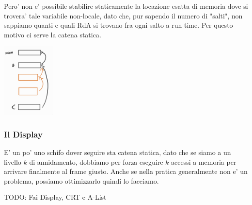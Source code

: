 Pero' non e' possibile stabilire staticamente la locazione esatta di memoria dove si trovera' tale variabile non-locale, dato che, pur sapendo il numero di "salti", non sappiamo quanti e quali RdA si trovano fra ogni salto a run-time. Per questo motivo ci serve la catena statica.

\begin{center}
  \includegraphics[width=0.2\textwidth]{img/2025-03-06-13-14-42.png}
\end{center}

\subsubsection{Il Display}

E' un po' uno schifo dover seguire sta catena statica, dato che se siamo a un livello $ k $ di annidamento, dobbiamo per forza eseguire $ k $ accessi a memoria per arrivare finalmente al frame giusto. Anche se nella pratica generalmente non e' un problema, possiamo ottimizzarlo quindi lo facciamo.

TODO: Fai Display, CRT e A-List

% 
